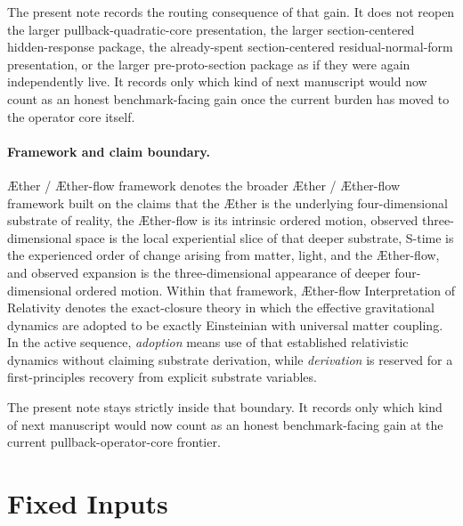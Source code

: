 \documentclass[11pt]{article}
\newcommand{\Aether}{\AE{}ther}
\newcommand{\Aflow}{\AE{}ther-flow}
\newcommand{\TheoryName}{\Aflow{} Interpretation of Relativity}
\newcommand{\TheoryProgram}{\Aether{} / \Aflow{} framework}
\begin{document}
The present note records the routing consequence of that gain. It does not reopen the larger pullback-quadratic-core presentation, the larger section-centered hidden-response package, the already-spent section-centered residual-normal-form presentation, or the larger pre-proto-section package as if they were again independently live. It records only which kind of next manuscript would now count as an honest benchmark-facing gain once the current burden has moved to the operator core itself.

\paragraph{Framework and claim boundary.}
\TheoryProgram{} denotes the broader \Aether{} / \Aflow{} framework built on the claims that the \Aether{} is the underlying four-dimensional substrate of reality, the \Aflow{} is its intrinsic ordered motion, observed three-dimensional space is the local experiential slice of that deeper substrate, S-time is the experienced order of change arising from matter, light, and the \Aflow{}, and observed expansion is the three-dimensional appearance of deeper four-dimensional ordered motion. Within that framework, \TheoryName{} denotes the exact-closure theory in which the effective gravitational dynamics are adopted to be exactly Einsteinian with universal matter coupling. In the active sequence, \emph{adoption} means use of that established relativistic dynamics without claiming substrate derivation, while \emph{derivation} is reserved for a first-principles recovery from explicit substrate variables.

The present note stays strictly inside that boundary. It records only which kind of next manuscript would now count as an honest benchmark-facing gain at the current pullback-operator-core frontier.

\section{Fixed Inputs}
\end{document}

